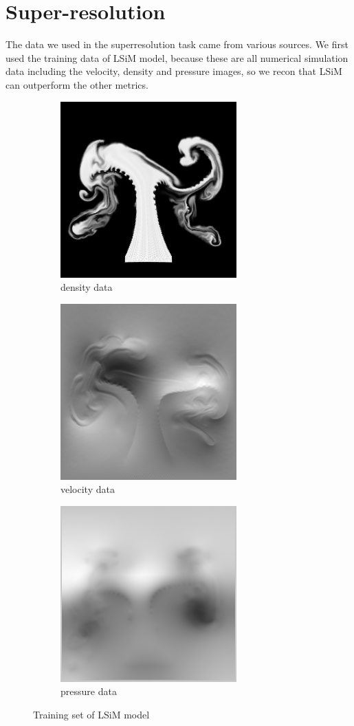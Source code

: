 \documentclass[a4paper,12pt,twoside]{report}
\begin{document}
\section{Super-resolution}
The data we used in the superresolution task came from various sources. We first used the training data of LSiM model, because these are all numerical simulation data including the velocity, density and pressure images, so we recon that LSiM can outperform the other metrics.
\begin{figure}
\centering
\begin{subfigure}{0.3\textwidth}
  \centering
  \includegraphics[scale=0.5]{density.png}
  \caption{density data}
\end{subfigure}
\begin{subfigure}{0.3\textwidth}
  \centering
  \includegraphics[scale=0.5]{velocity.png}
  \caption{velocity data}
\end{subfigure}
\begin{subfigure}{0.3\textwidth}
  \centering
  \includegraphics[scale=0.5]{pressure.png}
  \caption{pressure data}
\end{subfigure}
\caption{Training set of LSiM model}
\end{figure}
\end{document}

